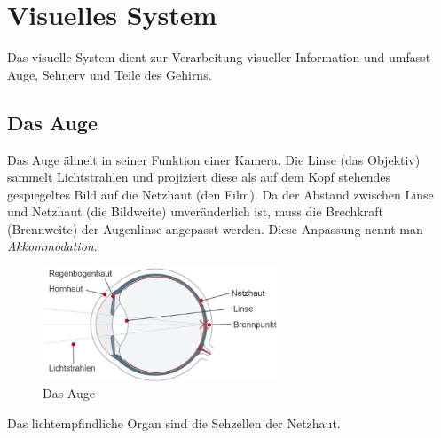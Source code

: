 \section{Visuelles System}
Das visuelle System dient zur Verarbeitung visueller Information und umfasst Auge, Sehnerv und Teile des Gehirns.

\subsection{Das Auge}
Das Auge ähnelt in seiner Funktion einer Kamera. Die Linse (das Objektiv) sammelt Lichtstrahlen und projiziert diese als auf dem Kopf stehendes gespiegeltes Bild auf die Netzhaut (den Film). Da der Abstand zwischen Linse und Netzhaut (die Bildweite) unveränderlich ist, muss die Brechkraft (Brennweite) der Augenlinse angepasst werden. Diese Anpassung nennt man \textit{Akkommodation}.
\begin{figure}
	\centering
	\includegraphics[width=7cm]{images/auge.jpg}
	\caption{Das Auge \cite{auge}}
\end{figure}

Das lichtempfindliche Organ sind die Sehzellen der Netzhaut.
